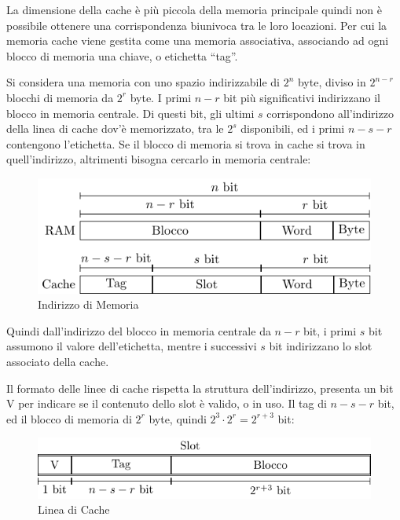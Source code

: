 \documentclass{article}
\numberwithin{equation}{subsection}
\begin{document}
La dimensione della cache è più piccola della memoria principale quindi non è possibile ottenere una corrispondenza biunivoca tra le loro locazioni. Per cui la memoria 
cache viene gestita come una memoria associativa, associando ad ogni blocco di memoria una chiave, o etichetta ``tag''. 

Si considera una memoria con uno spazio indirizzabile di $2^n$ byte, diviso in $2^{n-r}$ blocchi di memoria da $2^r$ byte. I primi $n-r$ bit più significativi 
indirizzano il blocco in memoria centrale. Di questi bit, gli ultimi $s$ corrispondono all'indirizzo della linea di cache dov'è memorizzato, tra le $2^s$ disponibili, ed i primi $n-s-r$ contengono l'etichetta.   
Se il blocco di memoria si trova in cache si trova in quell'indirizzo, altrimenti bisogna cercarlo in memoria centrale:

\begin{figure}[H]%
    \centering%
    \includegraphics{indirizzo-ram-cache.pdf}%
    \caption{Indirizzo di Memoria}%
\end{figure}

Quindi dall'indirizzo del blocco in memoria centrale da $n-r$ bit, i primi $s$ bit assumono il valore dell'etichetta, mentre i successivi $s$ bit 
indirizzano lo slot associato della cache. 

Il formato delle linee di cache rispetta la struttura dell'indirizzo, presenta un bit V per indicare se il contenuto dello slot è valido, o in uso. Il tag di $n-s-r$ bit, ed 
il blocco di memoria di $2^r$ byte, quindi $2^3\cdot2^r=2^{r+3}$ bit:

\begin{figure}[H]%
    \centering%
    \includegraphics{linea-cache.pdf}%
    \caption{Linea di Cache}%
\end{figure}
\end{document}
